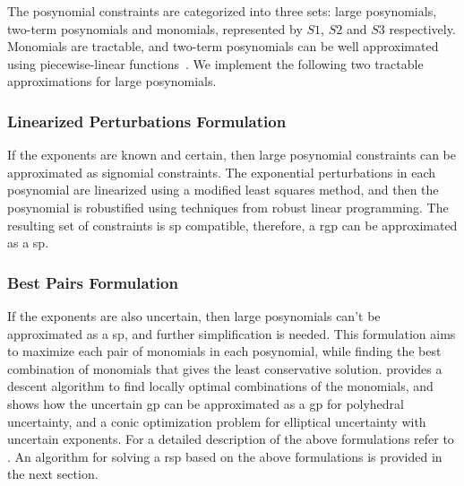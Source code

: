 The posynomial constraints are categorized into three sets: large posynomials, two-term posynomials and monomials,
represented by $S1$, $S2$ and $S3$ respectively.
Monomials are tractable, and two-term posynomials can be well approximated using piecewise-linear
functions~\cite{hsiung_kim_boyd_2007}.
We implement the following two tractable approximations for large posynomials.

\subsubsection{Linearized Perturbations Formulation}
If the exponents are known and certain, then large posynomial constraints can be approximated as signomial constraints.
The exponential perturbations in each posynomial are linearized using a modified least squares method, and then the
posynomial is robustified using techniques from robust linear programming. The resulting set of constraints is \gls{sp} compatible,
therefore, a \gls{rgp} can be approximated as a \gls{sp}.

\subsubsection{Best Pairs Formulation}
If the exponents are also uncertain, then large posynomials can't be approximated as a \gls{sp}, and further simplification is needed.
This formulation aims to maximize each pair of monomials in each posynomial,
while finding the best combination of monomials that gives the least conservative solution.
\cite{Saab2018} provides a descent algorithm to find locally optimal combinations of the monomials,
and shows how the uncertain \gls{gp} can be approximated as a \gls{gp} for polyhedral uncertainty,
and a conic optimization problem for elliptical uncertainty with uncertain exponents.
For a detailed description of the above formulations refer to \cite{Saab2018}.
An algorithm for solving a \gls{rsp} based on the above formulations is provided in the next section.
